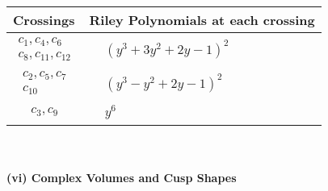 \documentclass[1p]{elsarticle_modified}
\theoremstyle{definition}
\begin{document}
\begin{tabular}{m{50pt}|m{274pt}}
Crossings & \hspace{64pt}Riley Polynomials at each crossing \\
\hline $$\begin{aligned}c_{1},c_{4},c_{6}\\c_{8},c_{11},c_{12}\end{aligned}$$&$\begin{aligned}
&(y^3+3 y^2+2 y-1)^2
\end{aligned}$\\
\hline $$\begin{aligned}c_{2},c_{5},c_{7}\\c_{10}\end{aligned}$$&$\begin{aligned}
&(y^3- y^2+2 y-1)^2
\end{aligned}$\\
\hline $$\begin{aligned}c_{3},c_{9}\end{aligned}$$&$\begin{aligned}
&y^6
\end{aligned}$\\
\hline
\end{tabular}\\~\\
\newpage\flushleft \textbf{(vi) Complex Volumes and Cusp Shapes}
\end{document}
